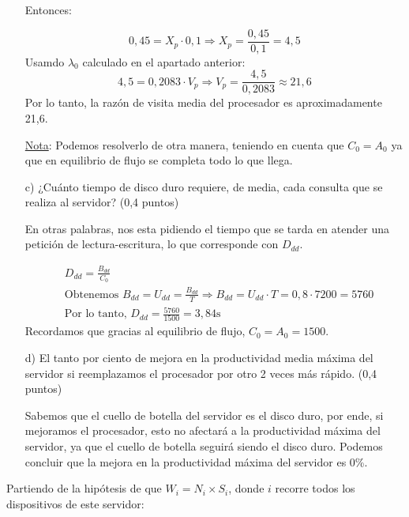 \documentclass[a4paper,12pt]{article}
\begin{document}
\begin{enumerate}
    Entonces:

    $$
    0,45 = X_p \cdot 0,1 \Rightarrow X_p = \frac{0,45}{0,1} = 4,5
    $$
    Usamdo $\lambda_0$ calculado en el apartado anterior:
    $$
    4,5 = 0,2083 \cdot V_p \Rightarrow V_p = \frac{4,5}{0,2083} \approx 21,6
    $$
    Por lo tanto, la razón de visita media del procesador es aproximadamente 21,6.

    \underline{Nota}: Podemos resolverlo de otra manera, teniendo en cuenta que $C_0 = A_0$ ya que en equilibrio de flujo se completa todo lo que llega.



    \item[c)] ¿Cuánto tiempo de disco duro requiere, de media, cada consulta que se realiza al servidor? (0,4 puntos)
    
    En otras palabras, nos esta pidiendo el tiempo que se tarda en atender una petición de lectura-escritura, lo que corresponde con $D_{dd}$.

    
    \begin{align*}
        &D_{dd} = \frac{B_{dd}}{C_0} \\
        &\text{Obtenemos } B_{dd} = U_{dd} = \frac{B_{dd}}{T} \Rightarrow B_{dd} = U_{dd} \cdot T = 0,8 \cdot 7200 = 5760 \\
        &\text{Por lo tanto, } D_{dd} = \frac{5760}{1500} = 3,84 \text{s}
    \end{align*}
    Recordamos que gracias al equilibrio de flujo, $C_0 = A_0 = 1500$.




    \item[d)] El tanto por ciento de mejora en la productividad media máxima del servidor si reemplazamos el procesador por otro 2 veces más rápido. (0,4 puntos)
    
    Sabemos que el cuello de botella del servidor es el disco duro, por ende, si mejoramos el procesador, esto no afectará a la productividad máxima del servidor, ya que el cuello de botella seguirá siendo el disco duro. Podemos concluir que la mejora en la productividad máxima del servidor es 0\%.

\end{enumerate}

Partiendo de la hipótesis de que $W_i = N_i \times S_i$, donde $i$ recorre todos los dispositivos de este servidor:
\end{document}
